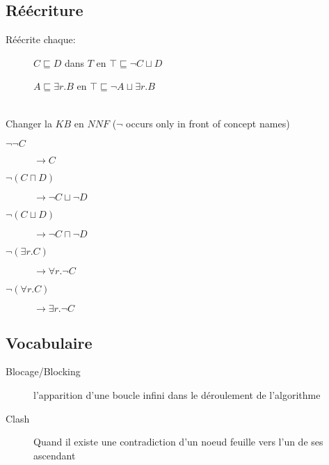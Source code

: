 \subsection{Réécriture}
Réécrite chaque:
\begin{description}
\item[] $C \sqsubseteq D$ dans $T$ en $\top \sqsubseteq \neg C \sqcup D$
\item[] $A \sqsubseteq \exists r.B$ en $\top \sqsubseteq \neg A \sqcup \exists r.B$
\end{description}
\ \\
Changer la $KB$ en $NNF$ ($\neg$ occurs only in front of concept names)
\begin{description}
\item[$\neg \neg C$] $\rightarrow C$
\item[$\neg (C \sqcap D)$] $\rightarrow \neg C \sqcup \neg D$
\item[$\neg (C \sqcup D)$] $\rightarrow \neg C \sqcap \neg D$
\item[$\neg (\exists r.C)$] $\rightarrow \forall r.\neg C$
\item[$\neg (\forall r.C)$] $\rightarrow \exists r.\neg C$
\end{description}

\subsection{Vocabulaire}
\begin{description}
\item[Blocage/Blocking] l'apparition d'une boucle infini dans le déroulement de l'algorithme 
\item[Clash] Quand il existe une contradiction d'un noeud feuille vers l'un de ses ascendant
\end{description}

